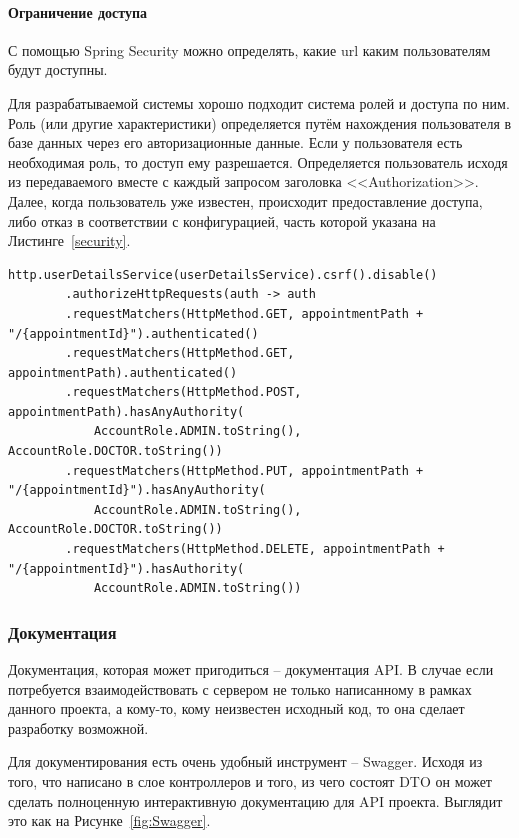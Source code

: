 \documentclass[a4paper,article]{article}
\begin{document}
    \paragraph{Ограничение доступа}
    
    С помощью Spring Security можно определять, какие url каким пользователям будут доступны.
    
    Для разрабатываемой системы хорошо подходит система ролей и доступа по ним. Роль (или другие характеристики) определяется путём нахождения пользователя в базе данных через его авторизационные данные. Если у пользователя есть необходимая роль, то доступ ему разрешается. Определяется пользователь исходя из передаваемого вместе с каждый запросом заголовка <<Authorization>>. Далее, когда пользователь уже известен, происходит предоставление доступа, либо отказ в соответствии с конфигурацией, часть которой указана на Листинге~\ref{security}.
    
    \begin{lstlisting}[label=security,caption=Пример кода для разграничения доступа]
    http.userDetailsService(userDetailsService).csrf().disable()
        .authorizeHttpRequests(auth -> auth
        .requestMatchers(HttpMethod.GET, appointmentPath + "/{appointmentId}").authenticated()
        .requestMatchers(HttpMethod.GET, appointmentPath).authenticated()
        .requestMatchers(HttpMethod.POST, appointmentPath).hasAnyAuthority(
            AccountRole.ADMIN.toString(), AccountRole.DOCTOR.toString())
        .requestMatchers(HttpMethod.PUT, appointmentPath + "/{appointmentId}").hasAnyAuthority(
            AccountRole.ADMIN.toString(), AccountRole.DOCTOR.toString())
        .requestMatchers(HttpMethod.DELETE, appointmentPath + "/{appointmentId}").hasAuthority(
            AccountRole.ADMIN.toString())
    \end{lstlisting}

    \subsubsection{Документация}\label{Реализация. Сервер. Документация}
    
    Документация, которая может пригодиться -- документация API. В случае если потребуется взаимодействовать с сервером не только написанному в рамках данного проекта, а кому-то, кому неизвестен исходный код, то она сделает разработку возможной.
    
    Для документирования есть очень удобный инструмент -- Swagger. Исходя из того, что написано в слое контроллеров и того, из чего состоят DTO он может сделать полноценную интерактивную документацию для API проекта. Выглядит это как на Рисунке~\ref{fig:Swagger}.
    
\end{document}
